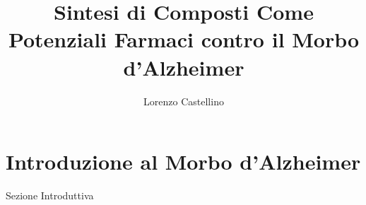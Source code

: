 \documentclass{article}
\title{Sintesi di Composti Come Potenziali Farmaci contro il Morbo d'Alzheimer}
\author{Lorenzo Castellino}
\begin{document}
\maketitle
\newpage
{}
\tableofcontents
\newpage
\section{Introduzione al Morbo d'Alzheimer}
Sezione Introduttiva
\end{document}

